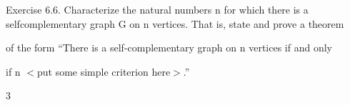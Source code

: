 \documentclass[a4paper,portrait,12pt]{article}
\begin{document}
\begin{flushleft}
Exercise 6.6. Characterize the natural numbers n for which there is a selfcomplementary graph G on n vertices. That is, state and prove a theorem
\end{flushleft}


\begin{flushleft}
of the form {``}There is a self-complementary graph on n vertices if and only
\end{flushleft}


\begin{flushleft}
if n $<$put some simple criterion here$>$.''
\end{flushleft}





3





\newpage
\end{document}
